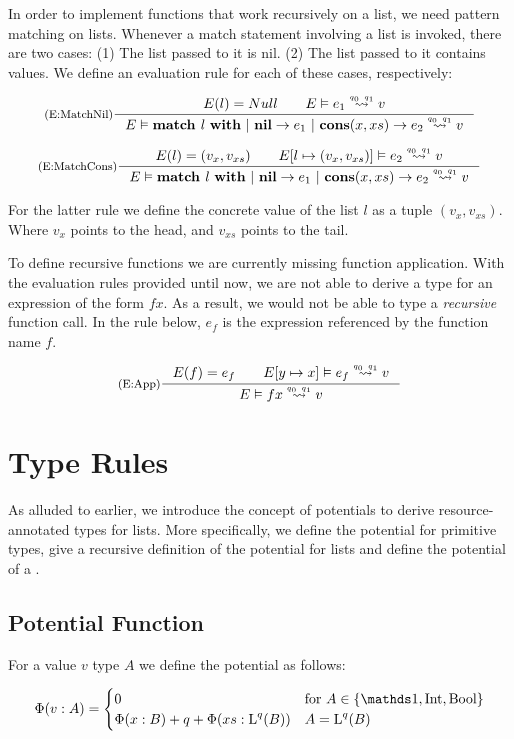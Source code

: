 In order to implement functions that work recursively on a list, we need pattern matching on lists. Whenever a match statement involving a list is invoked, there are two cases: (1) The list passed to it is nil. (2) The list passed to it contains values. We define an evaluation rule for each of these cases, respectively:

\[
   \inference[(E:MatchNil)]
   {E(l) = Null \qquad \evals{E}{e_1}{v}{q_0}{q_1}}
   {\evals{E}{\listmatch{l}{e_1}{e_2}}{v}{q_0}{q_1}}
\]

\[
   \inference[(E:MatchCons)]
   {E(l) = (v_x, v_{xs}) \qquad \evals{\envaugment{E}{l}{(v_x, v_{xs})}}{e_2}{v}{q_0}{q_1}}
   {\evals{E}{\listmatch{l}{e_1}{e_2}}{v}{q_0}{q_1}}
\]

For the latter rule we define the concrete value of the list \(l\) as a tuple \((v_x, v_{xs})\). Where \(v_x\) points to the head, and \(v_{xs}\) points to the tail. 

To define recursive functions we are currently missing function application. With the evaluation rules provided until now, we are not able to derive a type for an expression of the form \(f x\). As a result, we would not be able to type a \emph{recursive} function call. 
In the rule below, \(e_f\) is the expression referenced by the function name \(f\). 

\[
   \inference[(E:App)]
   {E(f) = e_f \qquad \evals{\envaugment{E}{y}{x}}{e_f}{v}{q_0}{q_1}}
   {\evals{E}{f x}{v}{q_0}{q_1}}
\]

\section{Type Rules}

As alluded to earlier, we introduce the concept of potentials to derive resource-annotated types for lists. More specifically, we define the potential for primitive types, give a recursive definition of the potential for lists and define the potential of a . 

\subsection{Potential Function}

\begin{definition}
   For a value \(v\) type \(A\) we define the potential as follows:

   \[
      \Phi(v : A) = \begin{cases}
         0                                            &\text{for } A \in \{\unit, \typeint, \bool\} \\
         \Phi(x : B) + q + \Phi(xs : \ralist{q}{B})  & A = \ralist{q}{B}\\
                    \end{cases}
   \]
\end{definition}

